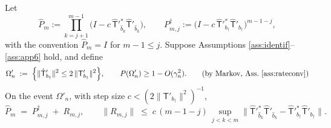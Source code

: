 \begin{lemma}\label{lem:propagator}
Let
\[
\hat P_m := \prod_{k=j+1}^{m-1}\bigl(I - c\,\hat{\mathsf T}'^{*}_{\hat b_k}
\hat{\mathsf T}'_{\hat b_k}\bigr),
\qquad
P^{\dagger}_{m,j} := \bigl(I - c\,\hat{\mathsf T}'^{*}_{b_\dagger}
\hat{\mathsf T}'_{b_\dagger}\bigr)^{m-1-j},
\]
with the convention $\hat P_m = I$ for $m - 1 \le j$. Suppose
Assumptions \ref{ass:identif}--\ref{ass:app6} hold, and define
\[
\Omega'_n \;:=\; \Bigl\{\|\hat{\mathsf T}'_{b_\dagger}\|^2
\le 2\,\|\mathsf T'_{b_\dagger}\|^2\Bigr\},
\qquad P(\Omega'_n) \ge 1 - O(\gamma_n^2). \tag{by Markov, Ass.~\ref{ass:rateconv}}
\]
On the event $\Omega'_n$, with step size $c < (2\|\mathsf T'_{b_\dagger}\|^2)^{-1}$,
\begin{equation}\label{eq:propagator}
\hat P_m \;=\; P^{\dagger}_{m,j} \;+\; R_{m,j},
\qquad
\|R_{m,j}\|
\;\le\; c\,(m - 1 - j)\,
\sup_{j < k < m}\!\bigl\|\hat{\mathsf T}'^{*}_{\hat b_k}\hat{\mathsf T}'_{\hat b_k}
- \hat{\mathsf T}'^{*}_{b_\dagger}\hat{\mathsf T}'_{b_\dagger}\bigr\|.
\end{equation}
\end{lemma}

